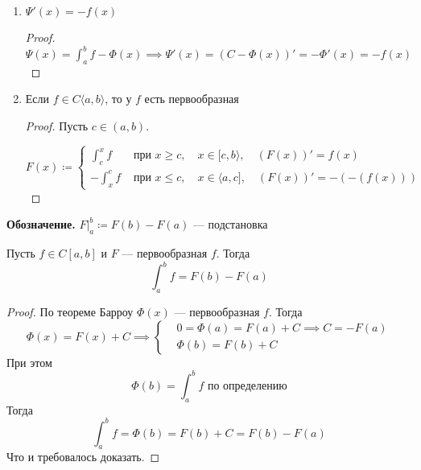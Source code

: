 \begin{follow}
  \begin{enumerate}
    \item $\Psi'(x) = -f(x)$
      \begin{proof}
          $\displaystyle\Psi(x) = \int_{a}^{b}f - \Phi(x) \implies \Psi'(x) = (C - \Phi(x))' = -\Phi'(x) = -f(x)$
      \end{proof}
    \item Если $f \in C\langle a, b \rangle$, то у $f$ есть первообразная
      \begin{proof}
          Пусть $c \in (a, b)$.

          \begin{equation*}
              F(x) \coloneqq
              \begin{cases}
                  \displaystyle
                  \int_{c}^{x} f & \text{ при $x \geq c$}, \quad x \in [c, b\rangle, \quad (F(x))' = f(x)\\
                  \displaystyle
                  -\int_{x}^{c} f & \text{ при $x \leq c$}, \quad x \in \langle a, c], \quad (F(x))' = -(-(f(x)))
              \end{cases}
          \end{equation*}
      \end{proof}
  \end{enumerate}
\end{follow}

\textbf{Обозначение.}
$F \big|_{a}^{b} \coloneqq F(b) - F(a)$ --- подстановка

\begin{theorem}
    Пусть $f \in C[a, b]$ и $F$ --- первообразная $f$. Тогда
    \begin{equation*}
        \int_{a}^{b} f = F(b) - F(a)
    \end{equation*}
\end{theorem}

\begin{proof}
    По теореме Барроу $\Phi(x)$ --- первообразная $f$. Тогда
    \begin{equation*}
      \Phi(x) = F(x) + C \implies
      \begin{cases}
        &0 = \Phi(a) = F(a) + C \implies C = -F(a) \\
        &\Phi(b) = F(b) + C
      \end{cases}
    \end{equation*}
    При этом
    \begin{equation*}
      \Phi(b) = \int_{a}^{b} f
      \text{ по определению}
    \end{equation*}
    Тогда
    \begin{equation*}
      \int_{a}^{b} f = \Phi(b) = F(b) + C = F(b) - F(a)
    \end{equation*}
    Что и требовалось доказать.
\end{proof}

